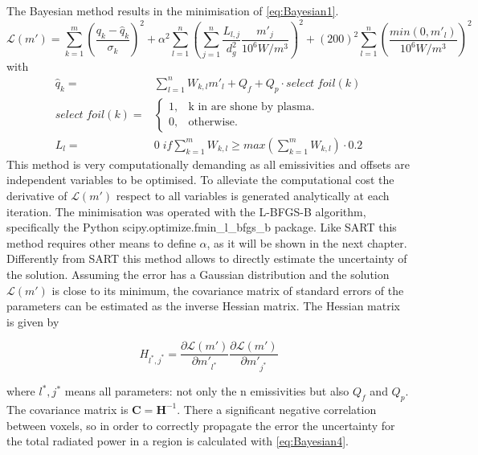 The Bayesian  method results in the minimisation of \autoref{eq:Bayesian1}.
\begin{equation}
\mathcal{L}(m') = \sum_{k=1}^{m} \left(\frac{q_k - \hat{q}_k}{\sigma_k}\right)^2 + \alpha^2\sum_{l=1}^{n} \left(\sum_{j=1}^{n} \frac{L_{l,j}}{d_g^2} \frac{m'_{j}}{10^6W/m^3} \right)^2 + (200)^2\sum_{l=1}^{n} \left( \frac{min(0,m'_l)}{10^6W/m^3} \right)^2
\label{eq:Bayesian1}
\end{equation}
with
\begin{equation}
\label{eq:Bayesian2}
\begin{aligned}
\hat{q}_k =& \sum_{l=1}^{n} W_{k,l} m'_{l} + Q_f + Q_p \cdot select \; foil(k) \\
select \; foil(k) =& \begin{cases}
    1, & \text{k in are shone by plasma}.\\
    0, & \text{otherwise}.
    \end{cases} \\
L_{l} =& 0 \;if \sum_{k=1}^{m} W_{k,l} \geq max \left( \sum_{k=1}^{m} W_{k,l} \right) \cdot 0.2
\end{aligned}
\end{equation}
This method is very computationally demanding as all emissivities and offsets are independent variables to be optimised. To alleviate the computational cost the derivative of $\mathcal{L}(m')$ respect to all variables is generated analytically at each iteration. The minimisation was operated with the L-BFGS-B algorithm, specifically the Python scipy.optimize.fmin\_l\_bfgs\_b package. \cite{Morales2011} Like SART this method requires other means to define $\alpha$, as it will be shown in the next chapter.
Differently from SART this method allows to directly estimate the uncertainty of the solution. Assuming the error has a Gaussian distribution and the solution $\mathcal{L}(m')$ is close to its minimum, the covariance matrix of standard errors of the parameters can be estimated as the inverse Hessian matrix.\cite{Thacker2013,Rhodri} The Hessian matrix is given by

\begin{equation}
H_{l^*,j^*} = \frac{\partial \mathcal{L}(m')}{\partial m'_{l^*}} \frac{\partial \mathcal{L}(m')}{\partial m'_{j^*}}
\label{eq:Bayesian3}
\end{equation}

where $l^*,j^*$ means all parameters: not only the n emissivities but also $Q_f$ and $Q_p$. The covariance matrix is $\bm{C}=\bm{H}^{-1}$. There a significant negative correlation between voxels, so in order to correctly propagate the error the uncertainty for the total radiated power in a region is calculated with \autoref{eq:Bayesian4}.

